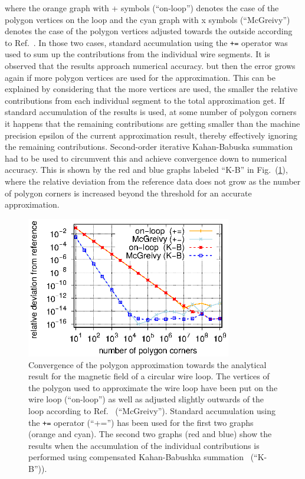 where the orange graph with + symbols (``on-loop'') denotes the case of the polygon vertices on the loop
and the cyan graph with x symbols (``McGreivy'') denotes the case of the polygon vertices adjusted towards the outside
according to Ref.~\cite{mcgreivy_2021}.
In those two cases, standard accumulation using the \texttt{+=} operator
was used to sum up the contributions from the individual wire segments.
It is observed that the results approach numerical accuracy.
but then the error grows again if more polygon vertices are used for the approximation.
This can be explained by considering that the more vertices are used,
the smaller the relative contributions from each individual segment to the total approximation get.
If standard accumulation of the results is used, at some number of polygon corners
it happens that the remaining contributions are getting smaller than the machine precision epsilon
of the current approximation result, thereby effectively ignoring the remaining contributions.
Second-order iterative Kahan-Babuska summation~\cite{klein_2006} had to be used
to circumvent this and achieve convergence down to numerical accuracy.
This is shown by the red and blue graphs labeled ``K-B'' in Fig.~(\ref{fig:McGreivy_convergence_2}),
where the relative deviation from the reference data does not grow
as the number of polygon corners is increased beyond the threshold for an accurate approximation.
\begin{figure}[htbp]
 \centering
 \includegraphics[width=0.8\textwidth]{img/McGreivy_convergence_2.eps}
 \caption{Convergence of the polygon approximation towards the analytical result for the magnetic field of a circular wire loop.
          The vertices of the polygon used to approximate the wire loop have been put on the wire loop (``on-loop'')
          as well as adjusted slightly outwards of the loop according to Ref.~\cite{mcgreivy_2021} (``McGreivy'').
          Standard accumulation using the \texttt{+=} operator (``+='') has been used for the first two graphs (orange and cyan).
          The second two graphs (red and blue) show the results when the accumulation of the individual contributions
          is performed using compensated Kahan-Babushka summation~\cite{klein_2006} (``K-B'')).}
 \label{fig:McGreivy_convergence_2}
\end{figure}
